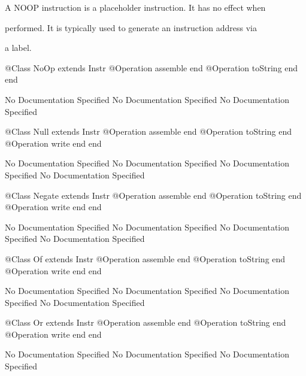       A NOOP instruction is a placeholder instruction. It has no effect when

      performed. It is typically used to generate an instruction address via

      a label.
\begin{Interface}
@Class NoOp extends Instr
  @Operation assemble end
  @Operation toString end
end
\end{Interface}
No Documentation Specified
No Documentation Specified
No Documentation Specified
\begin{Interface}
@Class Null extends Instr
  @Operation assemble end
  @Operation toString end
  @Operation write end
end
\end{Interface}
No Documentation Specified
No Documentation Specified
No Documentation Specified
No Documentation Specified
\begin{Interface}
@Class Negate extends Instr
  @Operation assemble end
  @Operation toString end
  @Operation write end
end
\end{Interface}
No Documentation Specified
No Documentation Specified
No Documentation Specified
No Documentation Specified
\begin{Interface}
@Class Of extends Instr
  @Operation assemble end
  @Operation toString end
  @Operation write end
end
\end{Interface}
No Documentation Specified
No Documentation Specified
No Documentation Specified
No Documentation Specified
\begin{Interface}
@Class Or extends Instr
  @Operation assemble end
  @Operation toString end
  @Operation write end
end
\end{Interface}
No Documentation Specified
No Documentation Specified
No Documentation Specified


